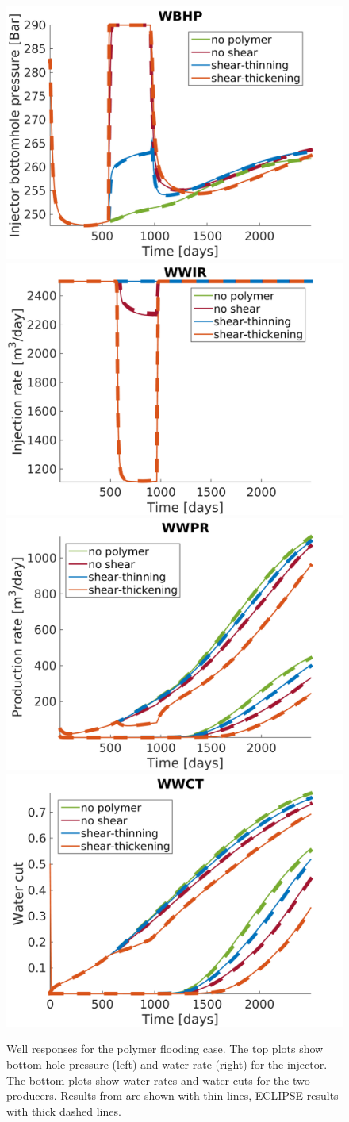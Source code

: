 \begin{figure}%
  \includegraphics[width=.49\textwidth]{figures/polymer/inj_wbhp} \hfill
  \includegraphics[width=.49\textwidth]{figures/polymer/inj_wwir} \\
  \includegraphics[width=.49\textwidth]{figures/polymer/prod_wwpr} \hfill
  \includegraphics[width=.49\textwidth]{figures/polymer/prod_wwct}
  \caption{Well responses for the polymer flooding case. The top plots show 
    bottom-hole pressure (left) and water rate (right) for the injector.
    The bottom plots show  water rates and water cuts for the two producers.
    Results from \opmflow are shown with thin lines, ECLIPSE results with thick
    dashed lines.}
  \label{fig:polymer_example_plotting}
\end{figure}


